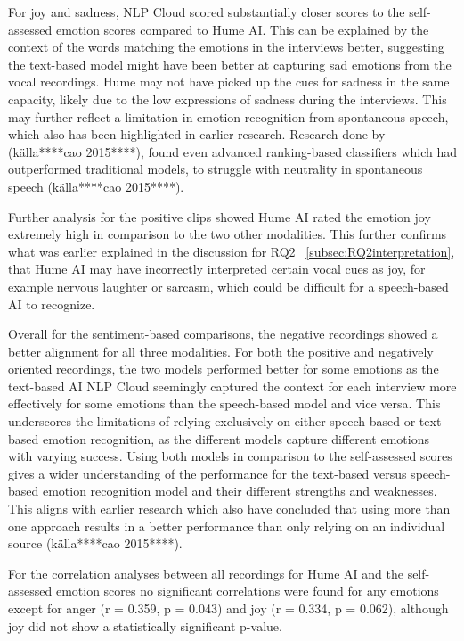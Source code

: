 For joy and sadness, NLP Cloud scored substantially closer scores to the self-assessed emotion scores compared to Hume AI. This can be explained by the context of the words matching the emotions in the interviews better, suggesting the text-based model might have been better at capturing sad emotions from the vocal recordings. Hume may not have picked up the cues for sadness in the same capacity, likely due to the low expressions of sadness during the interviews. This may further reflect a limitation in emotion recognition from spontaneous speech, which also has been highlighted in earlier research. Research done by (källa****cao 2015****), found even advanced ranking-based classifiers which had outperformed traditional models, to struggle with neutrality in spontaneous speech (källa****cao 2015****).

Further analysis for the positive clips showed Hume AI rated the emotion joy extremely high in comparison to the two other modalities. This further confirms what was earlier explained in the discussion for RQ2 ~\ref{subsec:RQ2interpretation}, that Hume AI may have incorrectly interpreted certain vocal cues as joy, for example nervous laughter or sarcasm, which could be difficult for a speech-based AI to recognize.

Overall for the sentiment-based comparisons, the negative recordings showed a better alignment for all three modalities. For both the positive and negatively oriented recordings, the two models performed better for some emotions as the text-based AI NLP Cloud seemingly captured the context for each interview more effectively for some emotions than the speech-based model and vice versa. This underscores the limitations of relying exclusively on either speech-based or text-based emotion recognition, as the different models capture different emotions with varying success. Using both models in comparison to the self-assessed scores gives a wider understanding of the performance for the text-based versus speech-based emotion recognition model and their different strengths and weaknesses. This aligns with earlier research which also have concluded that using more than one approach results in a better performance than only relying on an individual source (källa****cao 2015****).

For the correlation analyses between all recordings for Hume AI and the self-assessed emotion scores no significant correlations were found for any emotions except for anger (r = 0.359, p = 0.043) and joy (r = 0.334, p = 0.062), although joy did not show a statistically significant p-value. 

